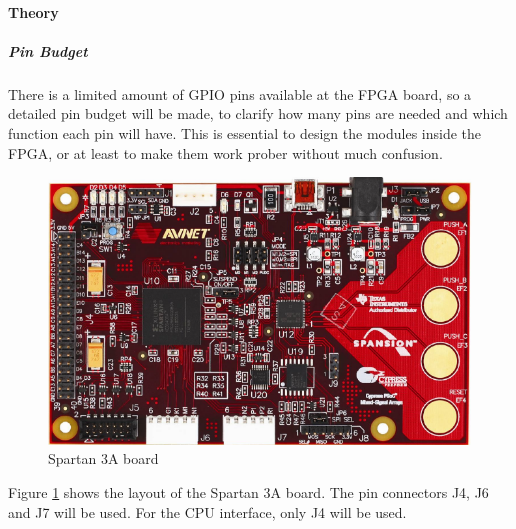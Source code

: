 \paragraph{Theory}\mbox{}

\subparagraph{Pin Budget}
There is a limited amount of GPIO pins available at the FPGA board, so a detailed pin budget will be made, to clarify how many pins are needed and which function each pin will have. This is essential to design the modules inside the FPGA, or at least to make them work prober without much confusion.


\begin{figure}[H]
\centering
\includegraphics[width=\textwidth]{./img/Spartan3Aboard}
\caption{Spartan 3A board}
\label{fig:Spartan3Aboard}
\end{figure}




Figure \ref{fig:Spartan3Aboard} shows the layout of the Spartan 3A board. The pin connectors J4, J6 and J7 will be used. For the CPU interface, only J4 will be used. 


